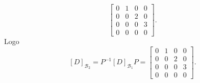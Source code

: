 \begin{exemplos}
\begin{enumerate}[label={\arabic*})]
\begin{solucao}
\[\begin{bmatrix}
                0 & 1 & 0 & 0\\
                0 & 0 & 2 & 0\\
                0 & 0 & 0 & 3\\
                0 & 0 & 0 & 0
            \end{bmatrix}.
            \]
            Logo
            \[
                [D]_{\mathcal{B}_2} = P^{-1}[D]_{\mathcal{B}_1}P = \begin{bmatrix}
                0 & 1 & 0 & 0\\
                0 & 0 & 2 & 0\\
                0 & 0 & 0 & 3\\
                0 & 0 & 0 & 0
                \end{bmatrix}.
            \]
        \end{solucao}
    \end{enumerate}
\end{exemplos}
